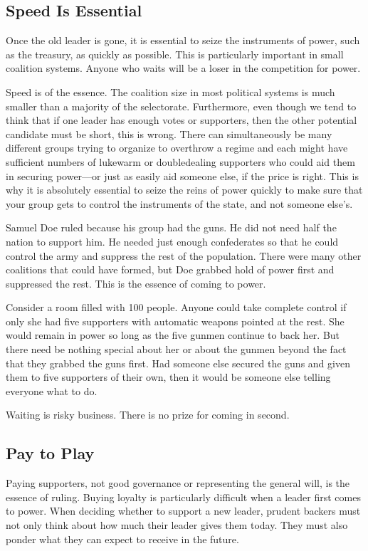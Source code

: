 \documentclass[10pt]{article}
\begin{document}
\subsection{Speed Is Essential}

{\large Once the old leader is gone, it is essential to seize the instruments of
power, such as the treasury, as quickly as possible. This is particularly
important in small coalition systems. Anyone who waits will be a loser in the
competition for power.}

{\large Speed is of the essence. The coalition size in most political systems is
much smaller than a majority of the selectorate. Furthermore, even though we tend
to think that if one leader has enough votes or supporters, then the other
potential candidate must be short, this is wrong. There can simultaneously be
many different groups trying to organize to overthrow a regime and each might
have sufficient numbers of lukewarm or doubledealing supporters who could aid
them in securing power---or just as easily aid someone else, if the price is
right. This is why it is absolutely essential to seize the reins of power quickly
to make sure that your group gets to control the instruments of the state, and
not someone else's.}

{\large Samuel Doe ruled because his group had the guns. He did not need half
the nation to support him. He needed just enough confederates so that he could
control the army and suppress the rest of the population. There were many other
coalitions that could have formed, but Doe grabbed hold of power first and
suppressed the rest. This is the essence of coming to power.}

{\large Consider a room filled with 100 people. Anyone could take complete
control if only she had five supporters with automatic weapons pointed at the
rest. She would remain in power so long as the five gunmen continue to back her.
But there need be nothing special about her or about the gunmen beyond the fact
that they grabbed the guns first. Had someone else secured the guns and given
them to five supporters of their own, then it would be someone else telling
everyone what to do.}

{\large Waiting is risky business. There is no prize for coming in second.}

\subsection{Pay to Play}

{\large Paying supporters, not good governance or representing the general will,
is the essence of ruling. Buying loyalty is particularly difficult when a leader
first comes to power. When deciding whether to support a new leader, prudent
backers must not only think about how much their leader gives them today. They
must also ponder what they can expect to receive in the future.}
\end{document}

